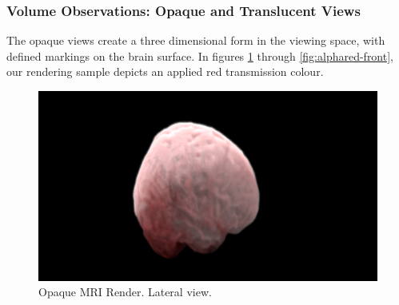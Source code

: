 \subsubsection{Volume Observations: Opaque and Translucent Views}
The opaque views create a three dimensional form in the viewing space, with defined markings on the brain surface. In figures \ref{fig:noalphared-lateral} through \ref{fig:alphared-front}, our rendering sample depicts an applied red transmission colour.


\begin{figure}[h]
 \centering %
 \includegraphics[width=\columnwidth]{pictures/bt-noalphared-lateral.png}
 \caption{Opaque MRI Render. Lateral view.}
 \label{fig:noalphared-lateral}
\end{figure}

